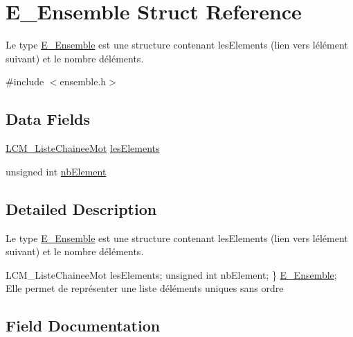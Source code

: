 \hypertarget{struct_e___ensemble}{}\section{E\+\_\+\+Ensemble Struct Reference}
\label{struct_e___ensemble}


Le type \hyperlink{struct_e___ensemble}{E\+\_\+\+Ensemble} est une structure contenant les\+Elements (lien vers l\textquotesingle{}élément suivant) et le nombre d\textquotesingle{}éléments.  




{\ttfamily \#include $<$ensemble.\+h$>$}

\subsection*{Data Fields}
\begin{DoxyCompactItemize}
\item 
\hyperlink{liste_chainee_mot_8h_ad50c59d1ac1fa184aba663121d8e4087}{L\+C\+M\+\_\+\+Liste\+Chainee\+Mot} \hyperlink{struct_e___ensemble_a31776e567813f922f724396c192ffd36}{les\+Elements}
\item 
unsigned int \hyperlink{struct_e___ensemble_a09f469f9924ee9a8290da83c6f7b76a0}{nb\+Element}
\end{DoxyCompactItemize}


\subsection{Detailed Description}
Le type \hyperlink{struct_e___ensemble}{E\+\_\+\+Ensemble} est une structure contenant les\+Elements (lien vers l\textquotesingle{}élément suivant) et le nombre d\textquotesingle{}éléments. 

L\+C\+M\+\_\+\+Liste\+Chainee\+Mot les\+Elements; unsigned int nb\+Element; \} \hyperlink{struct_e___ensemble}{E\+\_\+\+Ensemble}; Elle permet de représenter une liste d\textquotesingle{}éléments uniques sans ordre 

\subsection{Field Documentation}
\mbox{\label{struct_e___ensemble_a31776e567813f922f724396c192ffd36}} 
